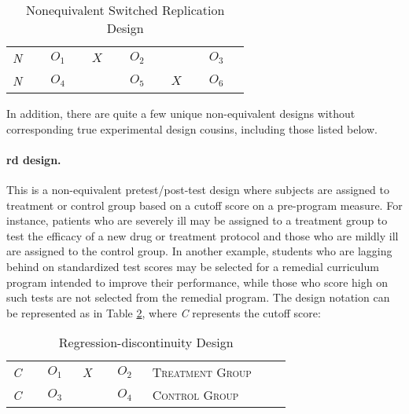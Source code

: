 \begin{table}[H]
	\centering
	\begin{tabularx}{0.75\linewidth}{p{0.10\linewidth}p{0.10\linewidth}p{0.10\linewidth}p{0.10\linewidth}p{0.10\linewidth}p{0.10\linewidth}}
		\toprule
		\textit{N} & $ O_1 $ & $ X $ & $ O_2 $ &       & $ O_3 $ \\
		\textit{N} & $ O_4 $ &       & $ O_5 $ & $ X $ & $ O_6 $ \\
		\bottomrule
	\end{tabularx}
	\caption{Nonequivalent Switched Replication Design}
	\label{09:tab09}
\end{table}

In addition, there are quite a few unique non-equivalent designs without corresponding true experimental design cousins, including those listed below.

\paragraph{\gls{rd} design.} This is a non-equivalent pretest/post-test design where subjects are assigned to treatment or control group based on a cutoff score on a pre-program measure. For instance, patients who are severely ill may be assigned to a treatment group to test the efficacy of a new drug or treatment protocol and those who are mildly ill are assigned to the control group. In another example, students who are lagging behind on standardized test scores may be selected for a remedial curriculum program intended to improve their performance, while those who score high on such tests are not selected from the remedial program. The design notation can be represented as in Table \ref{09:tab10}, where \textit{C} represents the cutoff score:

\begin{table}[H]
	\centering
	\begin{tabularx}{0.85\linewidth}{p{0.10\linewidth}p{0.10\linewidth}p{0.10\linewidth}p{0.10\linewidth}p{0.40\linewidth}}
		\toprule
		\textit{C} & $ O_1 $ & \textit{X} & $ O_2 $ & \textsc{Treatment Group} \\
		\textit{C} & $ O_3 $ &            & $ O_4 $ & \textsc{Control Group} \\
		\bottomrule
	\end{tabularx}
	\caption{Regression-discontinuity Design}
	\label{09:tab10}
\end{table}

